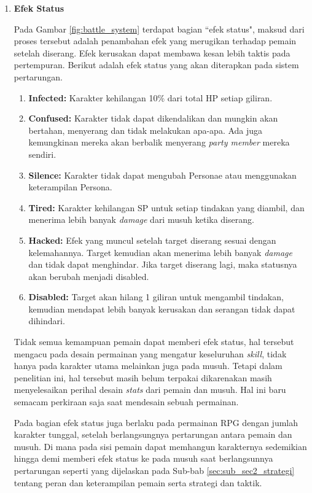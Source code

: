 \begin{subs}
\begin{enumerate}[label=\textbf{\arabic*).}]
		\item \textbf{Efek Status}
		
		Pada Gambar \ref{fig:battle_system} terdapat bagian ``efek status", maksud dari proses tersebut adalah penambahan efek yang merugikan terhadap pemain setelah diserang. Efek kerusakan dapat membawa kesan lebih taktis pada pertempuran. Berikut adalah efek status yang akan diterapkan pada sistem pertarungan.
		
		\begin{enumerate}[label=\alph*).]
			\item \textbf{Infected:} Karakter kehilangan 10\% dari total HP setiap giliran.
			
			\item \textbf{Confused:} Karakter tidak dapat dikendalikan dan mungkin akan bertahan, menyerang dan tidak melakukan apa-apa. Ada juga kemungkinan mereka akan berbalik menyerang \textit{party member} mereka sendiri.
			
			\item \textbf{Silence:} Karakter tidak dapat mengubah Personae atau menggunakan keterampilan Persona.
			
			\item \textbf{Tired:} Karakter kehilangan SP untuk setiap tindakan yang diambil, dan menerima lebih banyak \textit{damage} dari musuh ketika diserang.
			
			\item \textbf{Hacked:} Efek yang muncul setelah target diserang sesuai dengan kelemahannya. Target kemudian akan menerima lebih banyak \textit{damage} dan tidak dapat menghindar. Jika target diserang lagi, maka statusnya akan berubah menjadi disabled.
			
			\item \textbf{Disabled:} Target akan hilang 1 giliran untuk mengambil tindakan, kemudian mendapat lebih banyak kerusakan dan serangan tidak dapat dihindari.
		\end{enumerate}
		
		Tidak semua kemampuan pemain dapat memberi efek status, hal tersebut mengacu pada desain permainan yang mengatur keseluruhan \textit{skill}, tidak hanya pada karakter utama melainkan juga pada musuh. Tetapi dalam penelitian ini, hal tersebut masih belum terpakai dikarenakan masih menyelesaikan perihal desain \textit{stats} dari pemain dan musuh. Hal ini baru semacam perkiraan saja saat mendesain sebuah permainan.
		\vspace{1ex}
		
		Pada bagian efek status juga berlaku pada permainan RPG dengan jumlah karakter tunggal, setelah berlangsungnya pertarungan antara pemain dan musuh. Di mana pada sisi pemain dapat memhangun karakternya sedemikian hingga demi memberi efek status ke pada musuh saat berlangsunnya pertarungan seperti yang dijelaskan pada Sub-bab \ref{sec:sub_sec2_strategi} tentang peran dan keterampilan pemain serta strategi dan taktik.
		\vspace{1ex}
		

\end{enumerate}
\end{subs}
